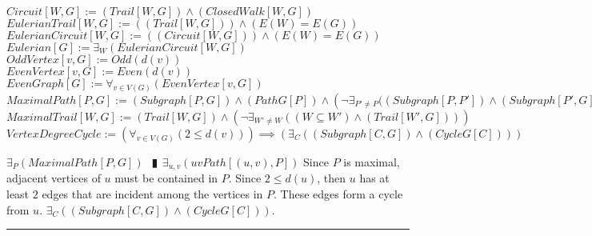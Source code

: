 \documentclass{book}
\newcommand{\abr}{:=}
\newcommand{\pipe}{$\phantom{(}\vrectangleblack\phantom{)}$}
\newcommand{\pr}[1]{\left(#1\right)}
\begin{document}
$Circuit[W, G] \abr (Trail[W, G]) \land (ClosedWalk[W, G])$ \\
$EulerianTrail[W, G] \abr \pr{(Trail[W, G])} \land \pr{E(W) = E(G)}$ \\
$EulerianCircuit[W, G] \abr \pr{(Circuit[W, G])} \land \pr{E(W) = E(G)}$ \\
$Eulerian[G] \abr \exists_{W}(EulerianCircuit[W, G])$ \\

$OddVertex[v, G] \abr Odd\pr{d(v)}$ \\
$EvenVertex[v, G] \abr Even\pr{d(v)}$ \\
$EvenGraph[G] \abr \forall_{v \in V(G)}(EvenVertex[v, G])$ \\

$MaximalPath[P, G] \abr (Subgraph[P, G]) \land (PathG[P]) \land \pr{\lnot \exists_{P' \neq P}((Subgraph[P, P']) \land (Subgraph[P', G]) \land (PathG[P'])}$ \\
$MaximalTrail[W, G] \abr (Trail[W, G]) \land \pr{\lnot \exists_{W' \neq W}\pr{(W \subseteq W') \land (Trail[W', G])}}$ \\

$VertexDegreeCycle \abr \pr{\forall_{v \in V(G)}\pr{2 \leq d(v)}} \implies \pr{\exists_{C}\pr{(Subgraph[C, G]) \land (CycleG[C])}}$
\begin{enumerate}
  \lit $\exists_{P}(MaximalPath[P, G])$ \pipe $\exists_{u, v}\pr{uvPath[(u, v), P]}$
  \lit Since $P$ is maximal, adjacent vertices of $u$ must be contained in $P$.
  \lit Since $2 \leq d(u)$, then $u$ has at least $2$ edges that are incident among the vertices in $P$.
  \lit These edges form a cycle from $u$. $\exists_{C}\pr{(Subgraph[C, G]) \land (CycleG[C])}$.
\end{enumerate} \vspace{.75mm} \hrule \vspace{.75mm} \ \\
\end{document}
